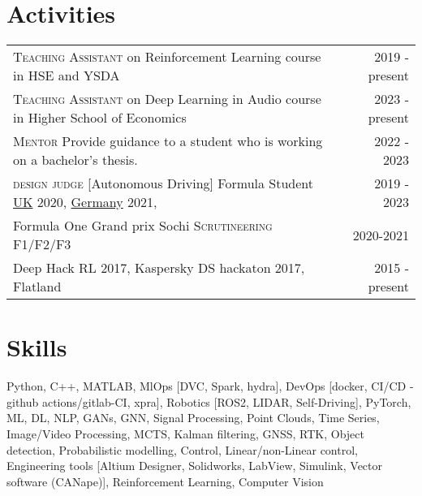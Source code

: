 \documentclass[]{resume}
\begin{document}
\section*{\sectionformat Activities}
\begin{tabular}{@{}L!{\VRule}R}
	{\textsc{Teaching Assistant}} on Reinforcement Learning course in HSE and YSDA               & 2019 - present
	\\
	{\textsc{Teaching Assistant}} on Deep Learning in Audio course in Higher School of Economics & 2023 - present
	\\
	{\textsc{Mentor}} Provide guidance to a student who is working on a bachelor's thesis.       & 2022 - 2023
	\\
	{\textsc{design judge}} [Autonomous Driving] Formula Student  \href{https://www.imeche.org/events/formula-student/team-information/fs-ai}{UK} 2020, \href{https://www.formulastudent.de/fsg/}{Germany} 2021,
	                                                                                             & 2019 - 2023
	\\
	Formula One Grand prix Sochi \textsc{Scrutineering F1/F2/F3}                                 & 2020-2021
	\\
	Deep Hack RL 2017, Kaspersky DS hackaton 2017, Flatland                                      & 2015 - present
\end{tabular}

\section*{\sectionformat Skills}
Python, C++, MATLAB, MlOps [DVC, Spark, hydra], DevOps [docker, CI/CD - github actions/gitlab-CI, xpra], Robotics [ROS2, LIDAR, Self-Driving], PyTorch, ML, DL, NLP, GANs, GNN, Signal Processing, Point Clouds, Time Series, Image/Video Processing,  MCTS, Kalman filtering, GNSS, RTK, Object detection, Probabilistic modelling, Control, Linear/non-Linear control, Engineering tools [Altium Designer, Solidworks, LabView, Simulink,  Vector software (CANape)], Reinforcement Learning, Computer Vision
\end{document}

